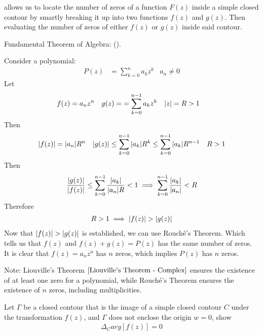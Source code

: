 \documentclass[12pt, english]{book}
\makeatletter
\renewenvironment{proof}[1][\proofname]{\par
	\pushQED{\qed}%
	\normalfont \topsep6\p@\@plus6\p@\relax
	\list{}{%
		\settowidth{\leftmargin}{\itshape\proofname:\hskip\labelsep}%
		\setlength{\labelwidth}{0pt}%
		\setlength{\itemindent}{-\leftmargin}%
	}%
	\item[\hskip\labelsep\itshape#1\@addpunct{:}]\ignorespaces
}{%
	\popQED\endlist\@endpefalse
}
\makeatother
\begin{document}
	 allows us to locate the number of zeros of a function \(F(z)\) inside a simple closed contour by smartly breaking it up into two functions \(f(z)\) and \(g(z)\). Then evaluating the number of zeros of either \(f(z)\) or \(g(z)\) inside said contour. 
	
	\begin{example}
		\label{Fundamental Theorem of Algebra via Rouche's Theorem Proof - Complex}
		Fundamental Theorem of Algebra: ().
		
		Consider a polynomial:
		\begin{align*}
			P(z) &= \sum_{k=0}^{n} a_k z^k & a_n \neq 0
		\end{align*}
		Let 
		\begin{align*}
			f(z) &= a_n z^n & g(z) = &= \sum_{k=0}^{n-1} a_k z^k & \abs{z} &= R > 1
		\end{align*}
		Then
		\begin{align*}
			\abs{f(z)} &= \abs{a_n} R^n & 
			\abs{g(z)} &\leq \sum_{k=0}^{n-1} \abs{a_k} R^k \leq \sum_{k=0}^{n-1} \abs{a_k} R^{n-1}
				& R>1 
		\end{align*}
		Then
		\begin{align*}
			\frac{\abs{g(z)}}{\abs{f(z)}} \leq  \sum_{k=0}^{n-1}\frac{\abs{a_k}}{\abs{a_n}R} < 1 
			\implies \sum_{k=0}^{n-1}\frac{\abs{a_k}}{\abs{a_n}} < R
		\end{align*}
		Therefore
		\begin{align*}
			R > 1 \implies \abs{f(z)} > \abs{g(z)}
		\end{align*}
		Now that \(\abs{f(z)} > \abs{g(z)}\) is established, we can use Rouché's Theorem. Which tells us that \(f(z)\) and \(f(z) + g(z) = P(z)\) has the same number of zeros. It is clear that \(f(z) = a_n z^n\) has \(n\) zeros, which implies \(P(z)\) has \(n\) zeros.
	\end{example}
	
	Note: Liouville's Theorem \(\cref{Liouville's Theorem - Complex}\) ensures the existence of at least one zero for a polynomial, while Rouché's Theorem ensures the existence of \(n\) zeros, including multiplicities.
	
	\begin{example}
		\label{Closed contour does not enclose origin implies winding number is zero Example - Complex}
		Let \(\Gamma\) be a closed contour that is the image of a simple closed contour \(C\) under the transformation \(f(z)\), and \(\Gamma\) does not enclose the origin \(w = 0\), show 
		\begin{align*}
			\Delta_{C} arg[f(z)] = 0
		\end{align*}
		\begin{proof}
			{\color{Grey}
			
			}
		\end{proof}
	\end{example}
	
\end{document}
